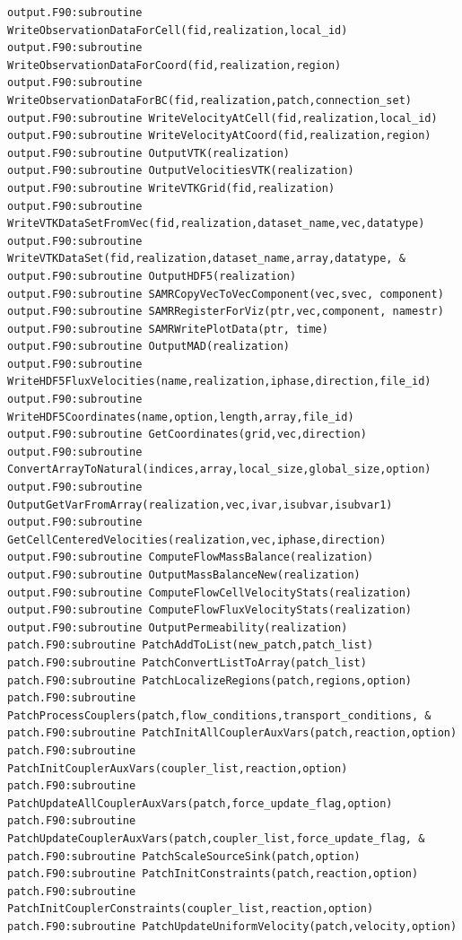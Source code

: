\documentclass[12pt]{article}
\begin{document}
\begin{verbatim}
output.F90:subroutine WriteObservationDataForCell(fid,realization,local_id)
output.F90:subroutine WriteObservationDataForCoord(fid,realization,region)
output.F90:subroutine WriteObservationDataForBC(fid,realization,patch,connection_set)
output.F90:subroutine WriteVelocityAtCell(fid,realization,local_id)
output.F90:subroutine WriteVelocityAtCoord(fid,realization,region)
output.F90:subroutine OutputVTK(realization)
output.F90:subroutine OutputVelocitiesVTK(realization)
output.F90:subroutine WriteVTKGrid(fid,realization)
output.F90:subroutine WriteVTKDataSetFromVec(fid,realization,dataset_name,vec,datatype)
output.F90:subroutine WriteVTKDataSet(fid,realization,dataset_name,array,datatype, &
output.F90:subroutine OutputHDF5(realization)
output.F90:subroutine SAMRCopyVecToVecComponent(vec,svec, component)
output.F90:subroutine SAMRRegisterForViz(ptr,vec,component, namestr)
output.F90:subroutine SAMRWritePlotData(ptr, time)
output.F90:subroutine OutputMAD(realization)
output.F90:subroutine WriteHDF5FluxVelocities(name,realization,iphase,direction,file_id)
output.F90:subroutine WriteHDF5Coordinates(name,option,length,array,file_id)
output.F90:subroutine GetCoordinates(grid,vec,direction)
output.F90:subroutine ConvertArrayToNatural(indices,array,local_size,global_size,option)
output.F90:subroutine OutputGetVarFromArray(realization,vec,ivar,isubvar,isubvar1)
output.F90:subroutine GetCellCenteredVelocities(realization,vec,iphase,direction)
output.F90:subroutine ComputeFlowMassBalance(realization)
output.F90:subroutine OutputMassBalanceNew(realization)
output.F90:subroutine ComputeFlowCellVelocityStats(realization)
output.F90:subroutine ComputeFlowFluxVelocityStats(realization)
output.F90:subroutine OutputPermeability(realization)
patch.F90:subroutine PatchAddToList(new_patch,patch_list)
patch.F90:subroutine PatchConvertListToArray(patch_list)
patch.F90:subroutine PatchLocalizeRegions(patch,regions,option)
patch.F90:subroutine PatchProcessCouplers(patch,flow_conditions,transport_conditions, &
patch.F90:subroutine PatchInitAllCouplerAuxVars(patch,reaction,option)
patch.F90:subroutine PatchInitCouplerAuxVars(coupler_list,reaction,option)
patch.F90:subroutine PatchUpdateAllCouplerAuxVars(patch,force_update_flag,option)
patch.F90:subroutine PatchUpdateCouplerAuxVars(patch,coupler_list,force_update_flag, &
patch.F90:subroutine PatchScaleSourceSink(patch,option)
patch.F90:subroutine PatchInitConstraints(patch,reaction,option)
patch.F90:subroutine PatchInitCouplerConstraints(coupler_list,reaction,option)
patch.F90:subroutine PatchUpdateUniformVelocity(patch,velocity,option)

\end{verbatim}
\end{document}
